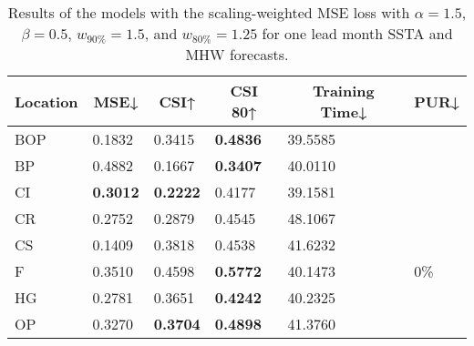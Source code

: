 \documentclass[11pt, a4paper]{article}
\begin{document}
\begin{table}[H]
\centering
\small
\caption{Results of the models with the scaling-weighted MSE loss with $\alpha=1.5$, $\beta=0.5$, $w_{90\%}=1.5$, and $w_{80\%}=1.25$ for one lead month SSTA and MHW forecasts.}\label{tb:swmse1}
\begin{tabular}{llllll}
\multicolumn{1}{c}{\textbf{Location}} & \multicolumn{1}{c}{\textbf{MSE↓}} & \multicolumn{1}{c}{\textbf{CSI↑}} & \multicolumn{1}{c}{\textbf{CSI 80↑}} & \multicolumn{1}{c}{\textbf{Training Time↓}} & \multicolumn{1}{c}{\textbf{PUR↓}} \\ \hline
BOP                         & 0.1832                            & 0.3415                            & \textbf{0.4836}                      & 39.5585                                     &                                   \\
BP                        & 0.4882                            & 0.1667                            & \textbf{0.3407}                      & 40.0110                                     &                                   \\
CI                        & \textbf{0.3012}                   & \textbf{0.2222}                   & 0.4177                               & 39.1581                                     &                                   \\
CR                           & 0.2752                            & 0.2879                            & 0.4545                               & 48.1067                                     &                                   \\
CS                           & 0.1409                            & 0.3818                            & 0.4538                               & 41.6232                                     &                                   \\
F                             & 0.3510                            & 0.4598                            & \textbf{0.5772}                      & 40.1473                                     & 0\%                               \\
HG                          & 0.2781                            & 0.3651                            & \textbf{0.4242}                      & 40.2325                                     &                                   \\
OP                       & 0.3270                            & \textbf{0.3704}                   & \textbf{0.4898}                      & 41.3760                                     &                                   \\

\end{tabular}
\end{table}
\end{document}
